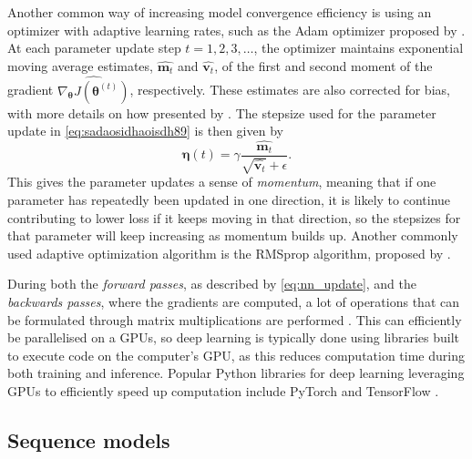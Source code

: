 \documentclass{statsmsc}
\begin{document}
{%
Another common way of increasing model convergence efficiency is using an optimizer with adaptive
learning rates, such as the Adam optimizer proposed by \cite{adam}.
At each parameter update step $t=1,2,3,\dots$, the optimizer maintains exponential moving average
estimates,
$\widehat{\mathbf{m}_t}$ and $\widehat{\mathbf{v}_t}$, of 
the first and second moment of the gradient $\widehat{\nabla_{\bm\theta}
J\left(\bm\theta^{(t)}\right)}$, respectively. These estimates are also corrected for bias, with
more details on how presented by \cite{adam}.
The stepsize used for the parameter update in \cref{eq:sadaosidhaoisdh89} is then given by
\begin{equation}
    \bm\eta(t)=\gamma \frac{\widehat{\mathbf{m}_t}}{\sqrt{\widehat{\mathbf{v}_t}}+\epsilon}.
\end{equation}
This gives the parameter updates a sense of \textit{momentum}, meaning that if one parameter has
repeatedly been updated in one direction, it is likely to continue contributing to lower loss if
it keeps moving in that direction,
so the stepsizes for that parameter will keep increasing  as momentum builds up.
Another commonly used adaptive optimization algorithm is the RMSprop algorithm,
proposed by \cite{rmsprop}. 

During both the \textit{forward passes}, as described by \cref{eq:nn_update}, and the
\textit{backwards passes}, where the gradients are computed, a lot of operations that can be
formulated through matrix multiplications are performed \citep{backprop}.
This can efficiently be parallelised on a \acp{GPU}, so deep learning is typically done using
libraries built to execute code on the computer's \ac{GPU}, as this reduces computation time
during both training and inference. Popular Python libraries for deep learning leveraging
\acp{GPU} to efficiently speed up computation include PyTorch \citep{pytorch} and TensorFlow \citep{tensorflow}.

\subsection{Sequence models}%
\label{sub:Sequence models}

}
\end{document}
